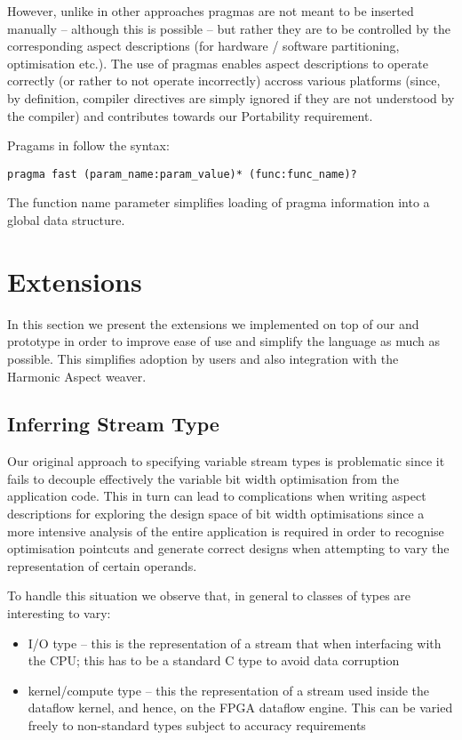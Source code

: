 However, unlike in other approaches pragmas are not
meant to be inserted manually -- although this is possible -- but
rather they are to be controlled by the corresponding aspect
descriptions (for hardware / software partitioning, optimisation
etc.). The use of pragmas enables aspect descriptions to operate
correctly (or rather to not operate incorrectly) accross various
platforms (since, by definition, compiler directives are simply
ignored if they are not understood by the compiler) and contributes
towards our Portability requirement.

Pragams in \FAST{} follow the syntax:

\texttt{pragma fast (param\_name:param\_value)* (func:func\_name)?}

The function name parameter simplifies loading of pragma information
into a global data structure.

\section{Extensions}

\label{sec:fast-extensions}

In this section we present the extensions we implemented on top of our
\FAST{} and \fastc{} prototype in order to improve ease of use and
simplify the language as much as possible. This simplifies adoption by
users and also integration with the Harmonic Aspect weaver.

\subsection{Inferring Stream Type}

Our original approach to specifying variable stream types is
problematic since it fails to decouple effectively the variable bit
width optimisation from the application code. This in turn can lead to
complications when writing aspect descriptions for exploring the
design space of bit width optimisations since a more intensive
analysis of the entire application is required in order to recognise
optimisation pointcuts and generate correct designs when attempting to
vary the representation of certain operands.

To handle this situation we observe that, in general to classes of
types are interesting to vary:
\begin{itemize}
\item I/O type -- this is the representation of a stream that when
  interfacing with the CPU; this has to be a standard C type to avoid
  data corruption
\item kernel/compute type -- this the representation of a stream used
  inside the dataflow kernel, and hence, on the FPGA dataflow
  engine. This can be varied freely to non-standard types subject to
  accuracy requirements
\end{itemize}

